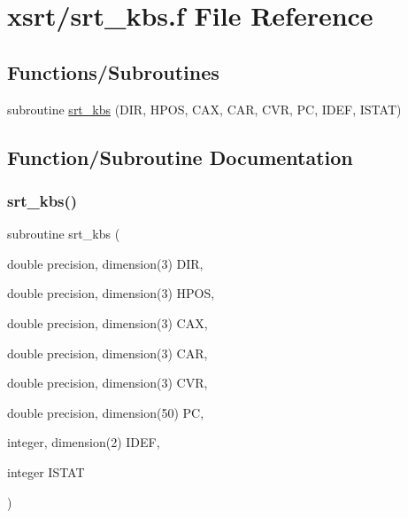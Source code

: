 \hypertarget{srt__kbs_8f}{}\section{xsrt/srt\+\_\+kbs.f File Reference}
\label{srt__kbs_8f}
\subsection*{Functions/\+Subroutines}
\begin{DoxyCompactItemize}
\item 
subroutine \hyperlink{srt__kbs_8f_ab46699f05afaea2b7ca7af7e44200451}{srt\+\_\+kbs} (D\+IR, H\+P\+OS, C\+AX, C\+AR, C\+VR, PC, I\+D\+EF, I\+S\+T\+AT)
\end{DoxyCompactItemize}


\subsection{Function/\+Subroutine Documentation}
\mbox{\label{srt__kbs_8f_ab46699f05afaea2b7ca7af7e44200451}} 
\subsubsection{\texorpdfstring{srt\+\_\+kbs()}{srt\_kbs()}}
{\footnotesize\ttfamily subroutine srt\+\_\+kbs (\begin{DoxyParamCaption}\item[{double precision, dimension(3)}]{D\+IR,  }\item[{double precision, dimension(3)}]{H\+P\+OS,  }\item[{double precision, dimension(3)}]{C\+AX,  }\item[{double precision, dimension(3)}]{C\+AR,  }\item[{double precision, dimension(3)}]{C\+VR,  }\item[{double precision, dimension(50)}]{PC,  }\item[{integer, dimension(2)}]{I\+D\+EF,  }\item[{integer}]{I\+S\+T\+AT }\end{DoxyParamCaption})}

